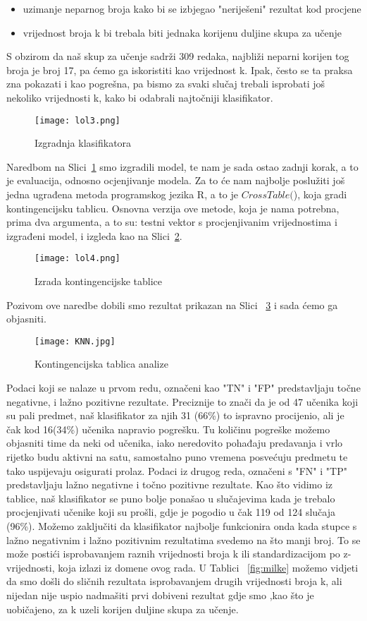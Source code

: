 \documentclass[times, utf8, zavrsni, numeric]{fer}
\begin{document}
\begin{itemize}
\item uzimanje neparnog broja kako bi se izbjegao "neriješeni" rezultat kod procjene
\item vrijednost broja k bi trebala biti jednaka korijenu duljine skupa za učenje
\end{itemize}
S obzirom da naš skup za učenje sadrži 309 redaka, najbliži neparni korijen tog broja je broj 17, pa ćemo ga iskoristiti kao vrijednost k. Ipak, često se ta praksa zna pokazati i kao pogrešna, pa bismo za svaki slučaj trebali isprobati još nekoliko vrijednosti k, kako bi odabrali najtočniji klasifikator.

\begin{figure}[H]
\centering
\texttt{[image: lol3.png]}
\caption{Izgradnja klasifikatora}
\label{fig:lol3}
\end{figure}
Naredbom na Slici~\ref{fig:lol3} smo izgradili model, te nam je sada ostao zadnji korak, a to je evaluacija, odnosno ocjenjivanje modela. Za to će nam najbolje poslužiti još jedna ugrađena metoda programskog jezika R, a to je $CrossTable($), koja gradi kontingencijsku tablicu. Osnovna verzija ove metode, koja je nama potrebna, prima dva argumenta, a to su: testni vektor s procjenjivanim vrijednostima i izgrađeni model, i izgleda kao na Slici~\ref{fig:lol4}.
\begin{figure}[H]
\centering
\texttt{[image: lol4.png]}
\caption{Izrada kontingencijske tablice}
\label{fig:lol4}
\end{figure}
Pozivom ove naredbe dobili smo rezultat prikazan na Slici ~\ref{fig:KNN} i sada ćemo ga objasniti.
\begin{figure}[H]
\centering
\texttt{[image: KNN.jpg]}
\caption{Kontingencijska tablica analize}
\label{fig:KNN}
\end{figure}
Podaci koji se nalaze u prvom redu, označeni kao "TN" i "FP" predstavljaju točne negativne, i lažno pozitivne rezultate. Preciznije to znači da je od 47 učenika koji su pali predmet, naš klasifikator za njih 31 (66\%) to ispravno procijenio, ali je čak kod 16(34\%) učenika napravio pogrešku. Tu količinu pogreške možemo objasniti time da neki od učenika, iako neredovito pohađaju predavanja i vrlo rijetko budu aktivni na satu, samostalno puno vremena posvećuju predmetu te tako uspijevaju osigurati prolaz. Podaci iz drugog reda, označeni s "FN" i "TP" predstavljaju lažno negativne i točno pozitivne rezultate. Kao što vidimo iz tablice, naš klasifikator se puno bolje ponašao u slučajevima kada je trebalo procjenjivati učenike koji su prošli, gdje je pogodio u čak 119 od 124 slučaja (96\%). Možemo zaključiti da klasifikator najbolje funkcionira onda kada stupce s lažno negativnim i lažno pozitivnim rezultatima svedemo na što manji broj. To se može postići isprobavanjem raznih vrijednosti broja k ili standardizacijom po z-vrijednosti, koja izlazi iz domene ovog rada. U Tablici ~\ref{fig:milke} možemo vidjeti da smo došli do sličnih rezultata isprobavanjem drugih vrijednosti broja k, ali nijedan nije uspio nadmašiti prvi dobiveni rezultat gdje smo ,kao što je uobičajeno, za k uzeli korijen duljine skupa za učenje.
\end{document}
